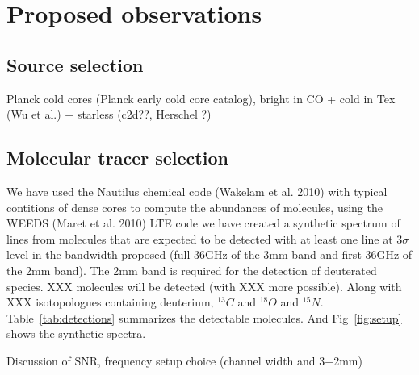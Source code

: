 \section{Proposed observations}
\subsection{Source selection}
  Planck cold cores (Planck early cold core catalog), bright in CO + cold in Tex (Wu et al.) + starless (c2d??, Herschel ?)
\subsection{Molecular tracer selection}
  We have used the Nautilus chemical code (Wakelam et al. 2010) with typical contitions of dense cores to compute the abundances of molecules, using the WEEDS (Maret et al. 2010) LTE code we have created a synthetic spectrum of lines from molecules that are expected to be detected with at least one line at 3$\sigma$ level in the bandwidth proposed (full 36GHz of the 3mm band and first 36GHz of the 2mm band). The 2mm band is required for the detection of deuterated species. XXX molecules will be detected (with XXX more possible). Along with XXX isotopologues containing deuterium, $^{13}C$ and $^{18}O$ and $^{15}N$. Table~\ref{tab:detections} summarizes the detectable molecules. And Fig~\ref{fig:setup} shows the synthetic spectra.
  
  
  Discussion of SNR, frequency setup choice (channel width and 3+2mm)
  
  
  
  
  
  
  
